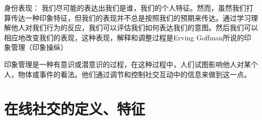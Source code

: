 身份表现：
我们尽可能的表达出我们是谁，我们的个人特征。然而，虽然我们打算传达一种印象特征，但我们的表现并不总是按照我们的预期来传达。通过学习理解他人对我们行为的反应，我们可以评估我们如何表达我们的意图。然后我们可以相应地改变我们的表现，这种表现，解释和调整过程是Erving Goffman所说的印象管理（印象操纵）

印象管理是一种有意识或潜意识的过程，在这种过程中，人们试图影响他人对某个人，物体或事件的看法。他们通过调节和控制社交互动中的信息来做到这一点。







\section{在线社交的定义、特征 %
}


